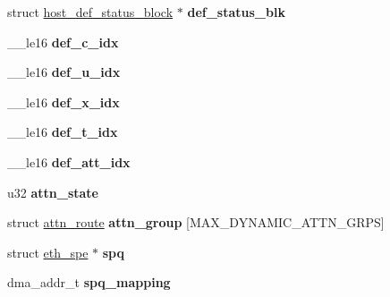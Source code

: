 \begin{DoxyCompactItemize}
\item 
\hypertarget{structbnx2x_ac05228bd6664854c9d0055d0aa652d19}{
struct \hyperlink{structhost__def__status__block}{host\_\-def\_\-status\_\-block} $\ast$ {\bfseries def\_\-status\_\-blk}}
\label{structbnx2x_ac05228bd6664854c9d0055d0aa652d19}

\item 
\hypertarget{structbnx2x_ad8a1a1b3ec9d00b2ed75db5a2c805dc9}{
\_\-\_\-le16 {\bfseries def\_\-c\_\-idx}}
\label{structbnx2x_ad8a1a1b3ec9d00b2ed75db5a2c805dc9}

\item 
\hypertarget{structbnx2x_ac41fd2eb970fbc3c7aa36d34726917ab}{
\_\-\_\-le16 {\bfseries def\_\-u\_\-idx}}
\label{structbnx2x_ac41fd2eb970fbc3c7aa36d34726917ab}

\item 
\hypertarget{structbnx2x_a709eff95454ffff82f20464a386f0620}{
\_\-\_\-le16 {\bfseries def\_\-x\_\-idx}}
\label{structbnx2x_a709eff95454ffff82f20464a386f0620}

\item 
\hypertarget{structbnx2x_a078c8ac0957a55156dc14dc5bf5080e0}{
\_\-\_\-le16 {\bfseries def\_\-t\_\-idx}}
\label{structbnx2x_a078c8ac0957a55156dc14dc5bf5080e0}

\item 
\hypertarget{structbnx2x_a90ad0bda40c997c325e099d392deadd6}{
\_\-\_\-le16 {\bfseries def\_\-att\_\-idx}}
\label{structbnx2x_a90ad0bda40c997c325e099d392deadd6}

\item 
\hypertarget{structbnx2x_ae4799583ab296dbe00f28e0f0092a109}{
u32 {\bfseries attn\_\-state}}
\label{structbnx2x_ae4799583ab296dbe00f28e0f0092a109}

\item 
\hypertarget{structbnx2x_a8400732d47f31771040b3007a1bfedb8}{
struct \hyperlink{structattn__route}{attn\_\-route} {\bfseries attn\_\-group} \mbox{[}MAX\_\-DYNAMIC\_\-ATTN\_\-GRPS\mbox{]}}
\label{structbnx2x_a8400732d47f31771040b3007a1bfedb8}

\item 
\hypertarget{structbnx2x_a15d5dcd5afe1ae78e2ebfc215b702265}{
struct \hyperlink{structeth__spe}{eth\_\-spe} $\ast$ {\bfseries spq}}
\label{structbnx2x_a15d5dcd5afe1ae78e2ebfc215b702265}

\item 
\hypertarget{structbnx2x_a0100460d9aa5cacd52eb1d441bdc6798}{
dma\_\-addr\_\-t {\bfseries spq\_\-mapping}}
\label{structbnx2x_a0100460d9aa5cacd52eb1d441bdc6798}


\end{DoxyCompactItemize}
